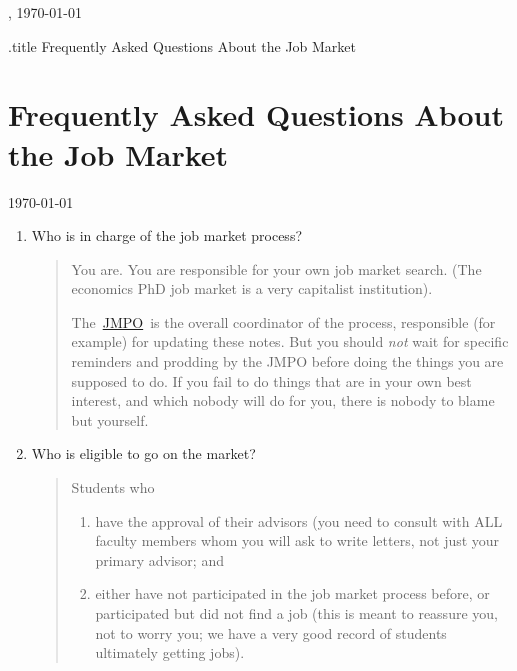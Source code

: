 \documentclass{\classes/econtex}
\begin{document}
\hfill{\tiny \jobname, \today} \vspace{.1in}

\begin{verbatimwrite}{\jobname.title}
  Frequently Asked Questions About the Job Market
\end{verbatimwrite}

\section*{\Large Frequently Asked Questions About the Job Market}\medskip\medskip

\centerline{\today}\medskip\medskip

\begin{enumerate}

\item Who is in charge of the job market process?
  \begin{quote}
    You are.  You are responsible for your own job market search.  (The economics PhD job market is a very capitalist institution).

    The~\href{\Notationurl}{JMPO}~is the overall coordinator of the process, responsible (for example) for updating these notes.  But you should \textit{not} wait for specific reminders and prodding by the JMPO before doing the things you are supposed to do. If you fail to do things that are in your own best interest, and which nobody will do for you, there is nobody to blame but yourself.

  \end{quote}

\item  Who is eligible to go on the market?
  \begin{quote}
    
    Students who

    \begin{enumerate}
      \item have the approval of their advisors (you need to consult with ALL faculty members whom you will ask to
        write letters, not just your primary advisor; and
        \item either have not participated in the job market process before,
    or participated but did not find a job (this is meant to reassure
    you, not to worry you; we have a very good record of students
    ultimately getting jobs).
    \end{enumerate}


\end{quote}
\end{enumerate}
\end{document}
